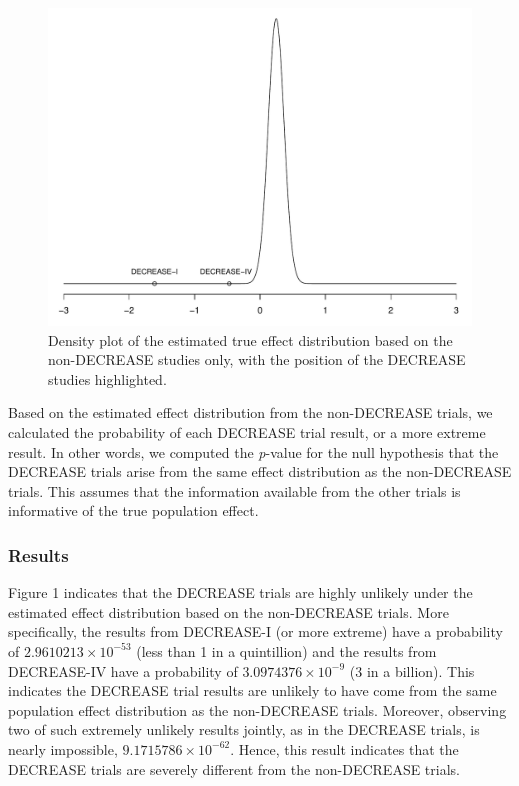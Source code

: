 \documentclass[]{article}
\begin{document}
\begin{figure}

{\centering \includegraphics[width=0.8\linewidth]{../figures/fig1} 

}

\caption{Density plot of the estimated true effect distribution based on the non-DECREASE studies only, with the position of the DECREASE studies highlighted.}\label{fig:figure 1}
\end{figure}

Based on the estimated effect distribution from the non-DECREASE trials,
we calculated the probability of each DECREASE trial result, or a more
extreme result. In other words, we computed the \emph{p}-value for the
null hypothesis that the DECREASE trials arise from the same effect
distribution as the non-DECREASE trials. This assumes that the
information available from the other trials is informative of the true
population effect.

\subsubsection{Results}\label{results-1}

Figure 1 indicates that the DECREASE trials are highly unlikely under
the estimated effect distribution based on the non-DECREASE trials. More
specifically, the results from DECREASE-I (or more extreme) have a
probability of \(2.9610213\times 10^{-53}\) (less than 1 in a
quintillion) and the results from DECREASE-IV have a probability of
\(3.0974376\times 10^{-9}\) (3 in a billion). This indicates the
DECREASE trial results are unlikely to have come from the same
population effect distribution as the non-DECREASE trials. Moreover,
observing two of such extremely unlikely results jointly, as in the
DECREASE trials, is nearly impossible, \(9.1715786\times 10^{-62}\).
Hence, this result indicates that the DECREASE trials are severely
different from the non-DECREASE trials.
\end{document}
